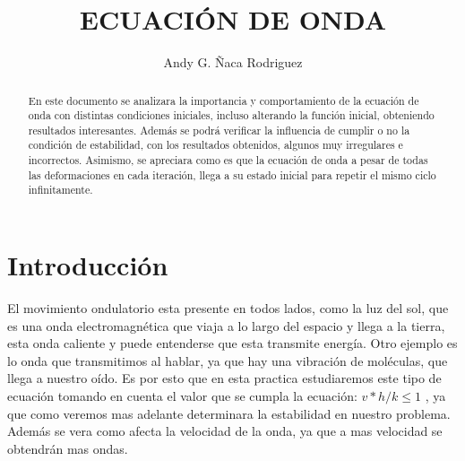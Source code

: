 \documentclass[letterpaper, 12 pt, conference]{ieeeconf}
\date{}
\title{\LARGE \bf
ECUACIÓN DE ONDA
}
\author{Andy G. Ñaca Rodriguez}
\begin{document}
\maketitle
\thispagestyle{empty}
\pagestyle{empty}

\begin{abstract}
En este documento se analizara la importancia y comportamiento de la ecuación de onda con distintas condiciones iniciales, incluso alterando la función inicial, obteniendo resultados interesantes. Además se podrá verificar la influencia de cumplir o no la condición de estabilidad, con los resultados obtenidos, algunos muy irregulares e incorrectos. Asimismo, se apreciara como es que la ecuación de onda a pesar de todas las deformaciones en cada iteración, llega a su estado inicial para repetir el mismo ciclo infinitamente.
\end{abstract}
\section{Introducción}
El movimiento ondulatorio esta presente en todos lados, como la luz del sol, que es una onda electromagnética que viaja a lo largo del espacio y llega a la tierra, esta onda caliente y puede entenderse que esta transmite energía. Otro ejemplo es lo onda que transmitimos al hablar, ya que hay una vibración de moléculas, que llega a nuestro oído. Es por esto que en esta practica estudiaremos este tipo de ecuación tomando en cuenta el valor que se cumpla la ecuación: $v*h/k\leq 1$ , ya que como veremos mas adelante determinara la estabilidad en nuestro problema. Además se vera como afecta la velocidad de la onda, ya que a mas velocidad se obtendrán mas ondas.
\end{document}
